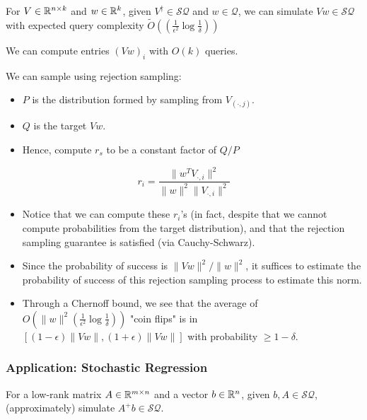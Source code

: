 \documentclass[main.tex]{subfiles}
\begin{document}
\begin{proposition}
	 For $V \in \mathbb{R}^{n\times k}$ and $w \in \mathbb{R}^k$, given $V^\dag \in \mathcal{SQ}$ and $w \in \mathcal{Q}$, we can simulate $Vw \in \mathcal{SQ}$ with expected query complexity $\tilde{O}((\frac{1}{\epsilon^2}\log\frac{1}{\delta}))$

We can compute entries $(Vw)_i$ with $O(k)$ queries.

We can sample using rejection sampling:

\begin{itemize}
\item $P$ is the distribution formed by sampling from $V_{(\cdot, j)}$.
  
\item $Q$ is the target $Vw$.
\item Hence, compute $r_s$ to be a constant factor of $Q / P$
\end{itemize}

$$r_i = \frac{\|w^T V_{\cdot, i}\|^2}{\|w\|^2\|V_{\cdot, i}\|^2}$$
\end{proposition}

\begin{itemize}
\item Notice that we can compute these $r_i$'s (in fact, despite that we cannot compute probabilities from the target distribution), and that the rejection sampling guarantee is satisfied (via Cauchy-Schwarz).

\item Since the probability of success is $\|Vw\|^2/ \| w\|^2$, it suffices to estimate the probability of success of this rejection sampling process to estimate this norm.

\item Through a Chernoff bound, we see that the average of $O(\|w\|^2(\frac{1}{\epsilon^2}\log\frac{1}{\delta}))$ "coin flips" is in $[(1-\epsilon)\|Vw\|,(1+\epsilon)\|Vw\|]$ with probability $\geq 1-\delta$.
\end{itemize}

\subsubsection{Application: Stochastic Regression}

For a low-rank matrix $A \in \mathbb{R}^{m\times n}$
  and a vector $b \in \mathbb{R}^n$, given $b, A \in \mathcal{SQ}$, (approximately) simulate $A^+b \in \mathcal{SQ}$.
\end{document}
